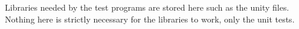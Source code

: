 Libraries needed by the test programs are stored here such as the unity files. Nothing here is strictly necessary for the libraries to work, only the unit tests. 